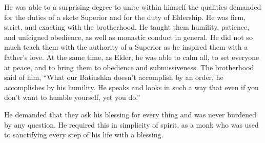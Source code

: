 He was able to a surprising degree to unite within himself the qualities demanded for the duties of a skete Superior and for the duty of Eldership. He was firm, strict, and exacting with the brotherhood. He taught them humility, patience, and unfeigned obedience, as well as monastic conduct in general. He did not so much teach them with the authority of a Superior as he inspired them with a father's love. At the same time, as Elder, he was able to calm all, to set everyone at peace, and to bring them to obedience and submissiveness. The brotherhood said of him, “What our Batiushka doesn't accomplish by an order, he accomplishes by his humility. He speaks and looks in such a way that even if you don't want to humble yourself, yet you do.”

He demanded that they ask his blessing for every thing and was never burdened by any question. He required this in simplicity of spirit, as a monk who was used to sanctifying every step of his life with a blessing.

